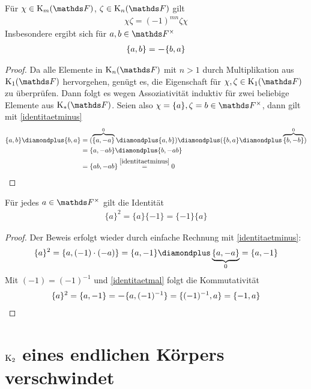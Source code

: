 \documentclass[ngerman,fontsize=11pt, paper=a4, parskip=half, titlepage=true, toc=bib]{scrartcl}
\begin{document}
\begin{Lem}\label{identitaetmal}
  Für $\chi\in\K_m(\F)$, $\zeta\in\K_n(\F)$ gilt
  \begin{gather*}
    \chi\zeta=(-1)^{mn}\zeta\chi
  \end{gather*}
  Insbesondere ergibt sich für $a,b\in \Fx$
  \begin{gather*}
    \{a,b\}= \boldsymbol -\{b,a\}
  \end{gather*}
  \begin{proof}
    Da alle Elemente in $\KnF$ mit $n>1$ durch Multiplikation aus
    $\KoF$ hervorgehen, genügt es, die Eigenschaft für
    $\chi,\zeta\in\KoF$ zu überprüfen. Dann folgt es wegen
    Assoziativität induktiv für zwei beliebige Elemente aus $\KF$.
    Seien also $\chi=\{a\},\zeta=b\in\Fx$, dann gilt mit \ref{identitaetminus}
    \begin{align*}
      \{a,b\}\p \{b,a\} 
      &= (\overbrace{\{a,-a\}}^{0} \p \{a,b\} )
        \p (\{b,a\} \p \overbrace{\{b,-b\}}^{0} ) \\
      &= \{ a,-ab \} \p \{b, -ab\}\\
      &= \{ ab, -ab\} \overset{\ref{identitaetminus}}{=} 0
    \end{align*}
  \end{proof}
\end{Lem}

\begin{Lem}\label{identitaetquadrat}
  Für jedes $a\in \Fx$ gilt die Identität
  \begin{gather}
    \{a\}^2 = \{a\}\{-1\} = \{-1\}\{a\}
  \end{gather}
  \begin{proof}
    Der Beweis erfolgt wieder durch einfache Rechnung mit
    \ref{identitaetminus}:
    \begin{gather*}
      \{a\}^2 = \{a,(-1)\cdot (-a)\} 
      = \{a,-1\}\p\underbrace{\{a,-a\}}_{0} = \{a,-1\}
    \end{gather*}
    Mit $(-1)=(-1)^{-1}$ und \ref{identitaetmal} folgt die Kommutativität
    \begin{gather*}
      \{a\}^2 = \{a,-1\}= \boldsymbol -\{a,(-1)^{-1}\} = \{(-1)^{-1},a\} = \{-1,a\}
    \end{gather*}
  \end{proof}
\end{Lem}


\section{$\operatorname{K}_2$ eines endlichen Körpers verschwindet}
\end{document}
